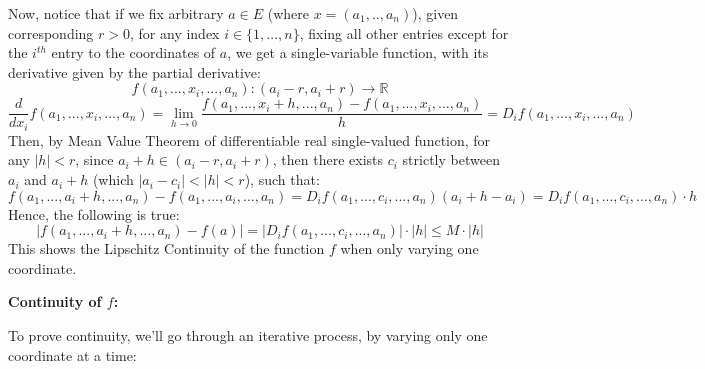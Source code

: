 \documentclass{article}
\begin{document}
Now, notice that if we fix arbitrary $a\in E$ (where $x=(a_1,..,a_n)$), given corresponding $r>0$, for any index $i\in\{1,...,n\}$, fixing all other entries except for the $i^{th}$ entry to the coordinates of $a$,
we get a single-variable function, with its derivative given by the partial derivative:
$$f(a_1,...,x_i,...,a_n):(a_i-r,a_i+r)\rightarrow \mathbb{R}$$
$$\frac{d}{dx_i}f(a_1,...,x_i,...,a_n)=\lim_{h\rightarrow 0}\frac{f(a_1,...,x_i+h,...,a_n)-f(a_1,...,x_i,...,a_n)}{h}=D_if(a_1,...,x_i,...,a_n)$$
Then, by Mean Value Theorem of differentiable real single-valued function, for any $|h|<r$, since $a_i+h\in (a_i-r,a_i+r)$, then there exists $c_i$ strictly between $a_i$ and $a_i+h$ (which $|a_i-c_i|<|h|<r$), such that:
$$f(a_1,...,a_i+h,...,a_n)-f(a_1,...,a_i,...,a_n)=D_if(a_1,...,c_i,...,a_n)(a_i+h-a_i)=D_if(a_1,...,c_i,...,a_n)\cdot h$$
Hence, the following is true:
$$|f(a_1,...,a_i+h,...,a_n)-f(a)|=|D_if(a_1,...,c_i,...,a_n)|\cdot|h|\leq M\cdot|h|$$
This shows the Lipschitz Continuity of the function $f$ when only varying one coordinate.

\hfil

\textbf{Continuity of $f$:}

To prove continuity, we'll go through an iterative process, by varying only one coordinate at a time: 
\end{document}

